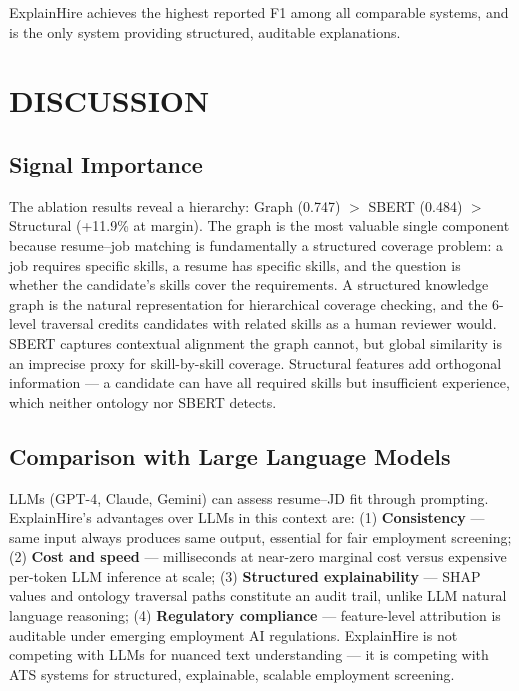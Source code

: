 \documentclass[12pt,a4paper]{report}
\begin{document}
ExplainHire achieves the highest reported F1 among all comparable systems, and is the only system providing structured, auditable explanations.

\chapter{DISCUSSION}

\section{Signal Importance}

The ablation results reveal a hierarchy: Graph (0.747) $>$ SBERT (0.484) $>$ Structural (+11.9\% at margin). The graph is the most valuable single component because resume--job matching is fundamentally a structured coverage problem: a job requires specific skills, a resume has specific skills, and the question is whether the candidate's skills cover the requirements. A structured knowledge graph is the natural representation for hierarchical coverage checking, and the 6-level traversal credits candidates with related skills as a human reviewer would. SBERT captures contextual alignment the graph cannot, but global similarity is an imprecise proxy for skill-by-skill coverage. Structural features add orthogonal information --- a candidate can have all required skills but insufficient experience, which neither ontology nor SBERT detects.

\section{Comparison with Large Language Models}

LLMs (GPT-4, Claude, Gemini) can assess resume--JD fit through prompting. ExplainHire's advantages over LLMs in this context are: (1) \textbf{Consistency} --- same input always produces same output, essential for fair employment screening; (2) \textbf{Cost and speed} --- milliseconds at near-zero marginal cost versus expensive per-token LLM inference at scale; (3) \textbf{Structured explainability} --- SHAP values and ontology traversal paths constitute an audit trail, unlike LLM natural language reasoning; (4) \textbf{Regulatory compliance} --- feature-level attribution is auditable under emerging employment AI regulations. ExplainHire is not competing with LLMs for nuanced text understanding --- it is competing with ATS systems for structured, explainable, scalable employment screening.
\end{document}
